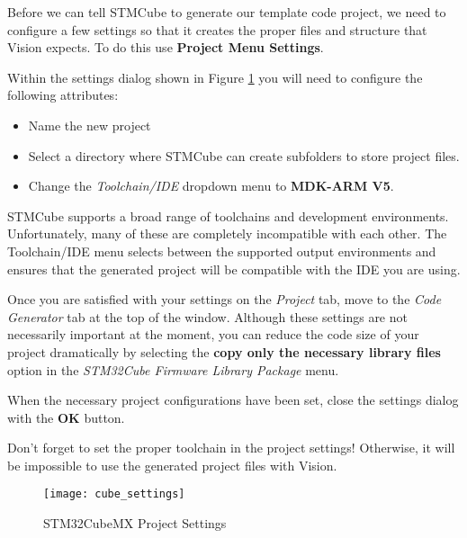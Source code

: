 \documentclass[openany,11pt,fleqn]{book} %
\begin{document}
Before we can tell STMCube to generate our template code project, we need to configure a few settings so that it creates the proper files and structure that {\textmu}Vision expects. To do this use \textbf{Project Menu \textrightarrow Settings}. 

Within the settings dialog shown in Figure \ref{cube_settings} you will need to configure the following attributes:
\begin{itemize}
	\item Name the new project
	\item Select a directory where STMCube can create subfolders to store project files.
	\item Change the \textit{Toolchain/IDE} dropdown menu to \textbf{MDK-ARM V5}.
\end{itemize}

STMCube supports a broad range of toolchains and development environments. Unfortunately, many of these are completely incompatible with each other. The Toolchain/IDE menu selects between the supported output environments and ensures that the generated project will be compatible with the IDE you are using. 

Once you are satisfied with your settings on the \textit{Project} tab, move to the \textit{Code Generator} tab at the top of the window. Although these settings are not necessarily important at the moment, you can reduce the code size of your project dramatically by selecting the \textbf{copy only the necessary library files} option in the \textit{STM32Cube Firmware Library Package} menu.
 
When the necessary project configurations have been set, close the settings dialog with the \textbf{OK} button. 

\begin{warning}
	Don't forget to set the proper toolchain in the project settings! Otherwise, it will be impossible to use the generated project files with {\textmu}Vision.
\end{warning}

\begin{figure}[h!]
	\centering\texttt{[image: cube\_settings]}
	\caption{STM32CubeMX Project Settings}
	\label{cube_settings}
\end{figure}
\end{document}
